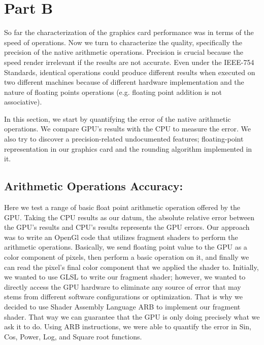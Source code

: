 \section{Part B}
So far the characterization of the graphics card performance was in terms of the speed of operations. Now we turn to characterize the quality, specifically the precision of the native arithmetic operations. Precision is crucial because the speed render irrelevant if the results are not accurate. Even under the IEEE-754 Standards, identical operations could produce different results when executed on two different machines because of different hardware implementation and the nature of floating points operations (e.g. floating point addition is not associative). 

In this section, we start by quantifying the error of the native arithmetic operations. We compare GPU's results with the CPU to measure the error. We also try to discover a precision-related undocumented features; floating-point representation in our graphics card and the rounding algorithm implemented in it.  

\subsection{Arithmetic Operations Accuracy:}
Here we test a range of basic float point arithmetic operation offered by the GPU. Taking the CPU results as our datum, the absolute relative error between the GPU's results and CPU's results represents the GPU errors. Our approach was to write an OpenGl code that utilizes fragment shaders to perform the arithmetic operations. Basically, we send floating point value to the GPU as a color component of pixels, then perform a basic operation on it, and finally we can read the pixel's final color component that we applied the shader to. Initially, we wanted to use GLSL to write our fragment shader; however, we wanted to directly access the GPU hardware to eliminate any source of error that may stems from different software configurations or optimization. That is why we decided to use Shader Assembly Language ARB to implement our fragment shader. That way we can guarantee that the GPU is only doing precisely what we ask it to do. Using ARB instructions, we were able to quantify the error in Sin, Cos, Power, Log, and Square root functions. 


